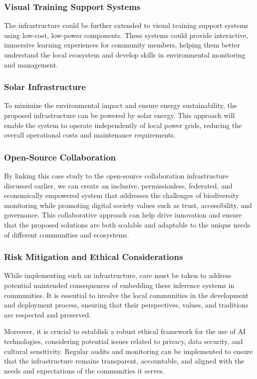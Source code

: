 \subsubsection{Visual Training Support Systems}
The infrastructure could be further extended to visual training support systems using low-cost, low-power components. These systems could provide interactive, immersive learning experiences for community members, helping them better understand the local ecosystem and develop skills in environmental monitoring and management.

\subsubsection{Solar Infrastructure}
To minimize the environmental impact and ensure energy sustainability, the proposed infrastructure can be powered by solar energy. This approach will enable the system to operate independently of local power grids, reducing the overall operational costs and maintenance requirements.

\subsubsection{Open-Source Collaboration}
By linking this case study to the open-source collaboration infrastructure discussed earlier, we can create an inclusive, permissionless, federated, and economically empowered system that addresses the challenges of biodiversity monitoring while promoting digital society values such as trust, accessibility, and governance. This collaborative approach can help drive innovation and ensure that the proposed solutions are both scalable and adaptable to the unique needs of different communities and ecosystems.

\subsubsection{Risk Mitigation and Ethical Considerations}
While implementing such an infrastructure, care must be taken to address potential unintended consequences of embedding these inference systems in communities. It is essential to involve the local communities in the development and deployment process, ensuring that their perspectives, values, and traditions are respected and preserved.

Moreover, it is crucial to establish a robust ethical framework for the use of AI technologies, considering potential issues related to privacy, data security, and cultural sensitivity. Regular audits and monitoring can be implemented to ensure that the infrastructure remains transparent, accountable, and aligned with the needs and expectations of the communities it serves.

